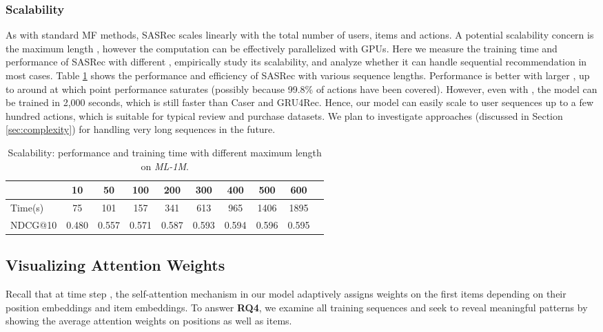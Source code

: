 \documentclass[conference]{IEEEtran}
\newcommand{\xhdr}[1]{\subsubsection*{\bf #1}}
\begin{document}
\xhdr{Scalability} As with standard MF methods, SASRec scales linearly with the total number of users, items and actions. A potential scalability concern is 
the maximum length , however
the computation can be effectively parallelized
with GPUs. 
Here
we measure the training time and performance of SASRec with different , empirically study its scalability, and analyze whether it can 
handle sequential recommendation in most cases. Table \ref{tab:scale} shows the performance and efficiency of SASRec with various sequence lengths. 
Performance is
better with larger ,
up to around  at which point
performance saturates (possibly because 99.8\% of actions have been covered). However, even with , the model can be trained in 2,000 seconds, which is still faster than Caser and GRU4Rec. Hence, our model can easily scale to user sequences 
up to a few hundred actions, which is suitable for typical review and purchase datasets.
We plan to investigate approaches (discussed in Section \ref{sec:complexity}) for handling very long sequences
in the future.



\begin{table}[h]
\centering
\caption{Scalability: performance and training time with different maximum length  on \emph{ML-1M}.}
\setlength{\tabcolsep}{3pt}
\begin{tabular}{lccccccccc}
\toprule
							&	10	&	50	&	100	&	200	&	300	&	400	&	500	&	600\\ \midrule                               
Time(s)  					&	75 	&	101 	&	157 	&	341 	&	613 	&	965 	&	1406 	&	1895 	&	\\
NDCG@10 					&	0.480 	&	0.557 	&	0.571 	&	0.587 	&	0.593 	&	0.594 	&	0.596 	&	0.595  \\                      
\bottomrule
\end{tabular}
\label{tab:scale}
\end{table}





\subsection{Visualizing Attention Weights}
\label{sec:vis}

Recall that at time step , the self-attention mechanism in our model adaptively assigns weights on the first  items depending on their position embeddings and item embeddings. To answer 
\textbf{RQ4}, we examine all 
training sequences and seek to reveal meaningful patterns by showing the average attention weights on positions as well as items.
\end{document}
